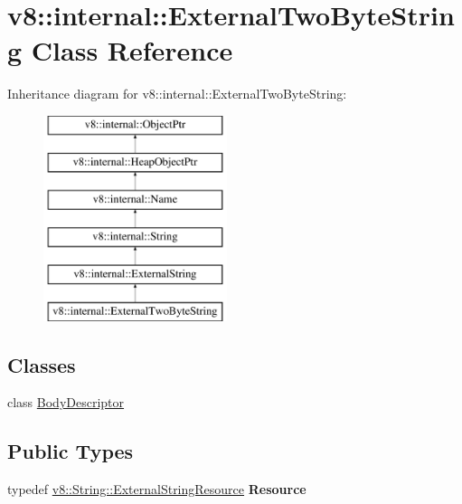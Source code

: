 \hypertarget{classv8_1_1internal_1_1ExternalTwoByteString}{}\section{v8\+:\+:internal\+:\+:External\+Two\+Byte\+String Class Reference}
\label{classv8_1_1internal_1_1ExternalTwoByteString}
Inheritance diagram for v8\+:\+:internal\+:\+:External\+Two\+Byte\+String\+:\begin{figure}[H]
\begin{center}
\leavevmode
\includegraphics[height=6.000000cm]{classv8_1_1internal_1_1ExternalTwoByteString}
\end{center}
\end{figure}
\subsection*{Classes}
\begin{DoxyCompactItemize}
\item 
class \mbox{\hyperlink{classv8_1_1internal_1_1ExternalTwoByteString_1_1BodyDescriptor}{Body\+Descriptor}}
\end{DoxyCompactItemize}
\subsection*{Public Types}
\begin{DoxyCompactItemize}
\item 
\mbox{\label{classv8_1_1internal_1_1ExternalTwoByteString_a5a74ee8539e114d51940dc69c742880b}} 
typedef \mbox{\hyperlink{classv8_1_1String_1_1ExternalStringResource}{v8\+::\+String\+::\+External\+String\+Resource}} {\bfseries Resource}
\end{DoxyCompactItemize}
